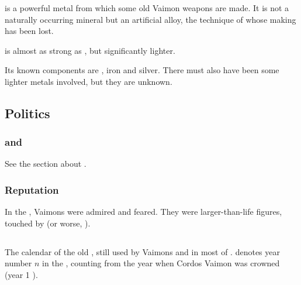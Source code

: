 \subsubsection{\Truesilver}
\index{\truesilver}
\Truesilver{} is a powerful metal from which some old Vaimon weapons are made. 
It is not a naturally occurring mineral but an artificial alloy, the technique of whose making has been lost. 

\Truesilver{} is almost as strong as \dragonsteel, but significantly lighter. 

Its known components are \dragonsteel, iron and silver. 
There must also have been some lighter metals involved, but they are unknown. 







\subsection{Politics}





\subsubsection{\Ortaicans and \rethyaxes}
See the section about . 





\subsubsection{Reputation}
In the , Vaimons were admired and feared. 
They were larger-than-life figures, touched by \Iquin (or worse, \itzach). 









\subsection{\VaimonCalendar}
\index{\VaimonCalendar}
\index{\VC}
The calendar of the old , still used by Vaimons and in most of \Velcad{}. 
 denotes year number $n$ in the \ImperialCalendar, counting from the year when Cordos Vaimon was crowned \caliph (year 1 \IC{}). 

